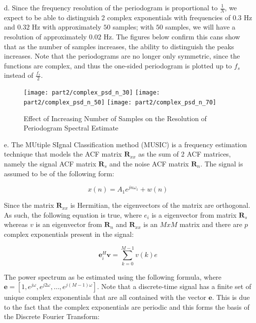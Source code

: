 \noindent{}d. Since the frequency resolution of the periodogram is proportional to $\frac{1}{N}$, we expect to be able to distinguish 2 complex exponentials with frequencies of $0.3$ Hz and $0.32$ Hz with approximately $50$ samples; with $50$ samples, we will have a resolution of approximately $0.02$ Hz. The figures below confirm this cans show that as the number of samples increases, the ability to distinguish the peaks increases. Note that the periodograms are no longer only symmetric, since the functions are complex, and thus the one-sided periodogram is plotted up to $f_s$ instead of $\frac{f_s}{2}$.

\begin{figure}[H]
\centering{}
\texttt{[image: part2/complex\_psd\_n\_30]}
\texttt{[image: part2/complex\_psd\_n\_50]}
\texttt{[image: part2/complex\_psd\_n\_70]}
\caption{Effect of Increasing Number of Samples on the Resolution of Periodogram Spectral Estimate}
\label{fig:complex_periodogram}
\end{figure}

\noindent{}e. The MUtiple SIgnal Classification method (MUSIC) is a frequency estimation technique that models the ACF matrix $\textbf{R}_{xx}$ as the sum of 2 ACF matrices, namely the signal ACF matrix $\textbf{R}_s$ and the noise ACF matrix $\textbf{R}_n$. The signal is assumed to be of the following form:

\begin{equation}
x(n) = A_1 e^{jn\omega_1} + w(n)
\end{equation}

Since the matrix $\textbf{R}_{xx}$ is Hermitian, the eigenvectors of the matrix are orthogonal. As such, the following equation is true, where $e_{i}$ is a eigenvector from matrix $\textbf{R}_s$ whereas $v$ is an eigenvector from $\textbf{R}_n$ and $\textbf{R}_{xx}$ is an $MxM$ matrix and there are $p$ complex exponentials present in the signal:

\begin{equation}
\textbf{e}_{i}^H \textbf{v} = \sum_{k=0}^{M-1} v(k)e%
\end{equation}

\noindent{}The power spectrum as be estimated using the following formula, where $\textbf{e} = [1, e^{j\omega}, e^{j2\omega},\dots, e^{j(M-1)\omega}]$. Note that a discrete-time signal has a finite set of unique complex exponentials that are all contained with the vector $\textbf{e}$. This is due to the fact that the complex exponentials are periodic and this forms the basis of the Discrete Fourier Transform:

